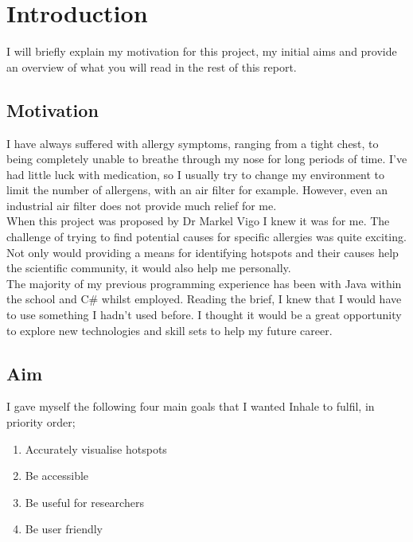 \chapter{Introduction}
\label{cha:intro}

I will briefly explain my motivation for this project, my initial aims and provide an overview of what you will read in the rest of this report.

\section{Motivation} 

I have always suffered with allergy symptoms, ranging from a tight chest, to being completely unable to breathe through my nose for long periods of time. I've had little luck with medication, so I usually try to change my environment to limit the number of allergens, with an air filter for example. However, even an industrial air filter does not provide much relief for me.\\

When this project was proposed by Dr Markel Vigo I knew it was for me. The challenge of trying to find potential causes for specific allergies was quite exciting. Not only would providing a means for identifying hotspots and their causes help the scientific community, it would also help me personally.\\

The majority of my previous programming experience has been with Java within the school and C\# whilst employed. Reading the brief, I knew that I would have to use something I hadn't used before. I thought it would be a great opportunity to explore new technologies and skill sets to help my future career.\\

\section{Aim}
\label{sec:aim}

I gave myself the following four main goals that I wanted Inhale to fulfil, in priority order;

\begin{enumerate}
  \item Accurately visualise hotspots
  \item Be accessible
  \item Be useful for researchers
  \item Be user friendly
\end{enumerate}


